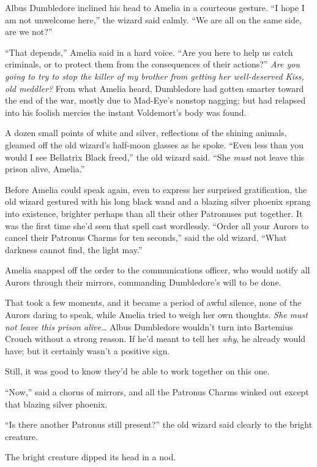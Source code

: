 Albus Dumbledore inclined his head to Amelia in a courteous gesture. ``I
hope I am not unwelcome here,'' the wizard said calmly. ``We are all on
the same side, are we not?''

``That depends,'' Amelia said in a hard voice. ``Are you here to help us
catch criminals, or to protect them from the consequences of their
actions?'' \emph{Are you going to try to stop the killer of my brother
from getting her well-deserved Kiss, old meddler?} From what Amelia
heard, Dumbledore had gotten smarter toward the end of the war, mostly
due to Mad-Eye's nonstop nagging; but had relapsed into his foolish
mercies the instant Voldemort's body was found.

A dozen small points of white and silver, reflections of the shining
animals, gleamed off the old wizard's half-moon glasses as he spoke.
``Even less than you would I see Bellatrix Black freed,'' the old wizard
said. ``She \emph{must} not leave this prison alive, Amelia.''

Before Amelia could speak again, even to express her surprised
gratification, the old wizard gestured with his long black wand and a
blazing silver phoenix sprang into existence, brighter perhaps than all
their other Patronuses put together. It was the first time she'd seen
that spell cast wordlessly. ``Order all your Aurors to cancel their
Patronus Charms for ten seconds,'' said the old wizard. ``What darkness
cannot find, the light may.''

Amelia snapped off the order to the communications officer, who would
notify all Aurors through their mirrors, commanding Dumbledore's will to
be done.

That took a few moments, and it became a period of awful silence, none
of the Aurors daring to speak, while Amelia tried to weigh her own
thoughts. \emph{She must not leave this prison alive\ldots{}} Albus
Dumbledore wouldn't turn into Bartemius Crouch without a strong reason.
If he'd meant to tell her \emph{why}, he already would have; but it
certainly wasn't a positive sign.

Still, it was good to know they'd be able to work together on this one.

``Now,'' said a chorus of mirrors, and all the Patronus Charms winked
out except that blazing silver phoenix.

``Is there another Patronus still present?'' the old wizard said clearly
to the bright creature.

The bright creature dipped its head in a nod.

